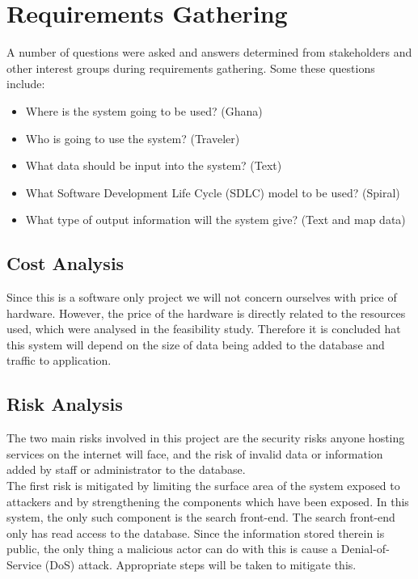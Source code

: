 \section{Requirements Gathering}
A number of questions were asked and answers determined from stakeholders and other interest groups during requirements gathering. Some these questions include:
		\begin{itemize}		
			\item Where is the system going to be used? (Ghana)
			\item Who is going to use the system? (Traveler)
			\item What data should be input into the system? (Text)
			\item What Software Development Life Cycle (SDLC) model to be used? (Spiral)
			\item What type of output information will the system give? (Text and map data)
		\end{itemize}

\subsection{Cost Analysis}
Since this is a software only project we will not concern ourselves with price of hardware.  However, the price of the hardware is directly related to the resources used, which were analysed in the feasibility study. Therefore it is concluded hat this system will depend on the size of data being added to the database and traffic to application.

\subsection{Risk Analysis}
The two main risks involved in this project are the security risks anyone hosting services on the internet will face, and the risk of invalid data or information added by staff or administrator to the database.\\

The first risk is mitigated by limiting the surface area of the system exposed to attackers and by strengthening the components which have been exposed. In this system, the only such component is the search front-end. The search front-end only has read access to the database. Since the information stored therein is public, the only thing a malicious actor can do with this is cause a Denial-of-Service (DoS) attack. Appropriate steps will be taken to mitigate this.\\

